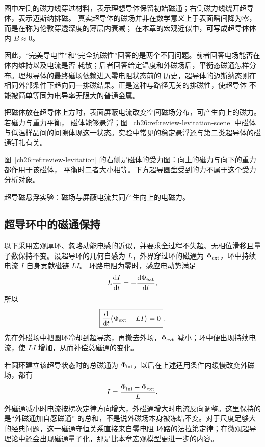 {图中左侧的磁力线穿过材料，表示理想导体保留初始磁通；右侧磁力线绕开超导体，表示迈斯纳排磁。
真实超导体的磁场并非在数学意义上于表面瞬间降为零，而是在称为伦敦穿透深度的薄层内衰减；
在本章的宏观近似中，可写成超导体体内 $B\approx0$。

因此，“完美导电性”和“完全抗磁性”回答的是两个不同问题。前者回答电场能否在体内维持以及电流是否
耗散；后者回答给定温度和外磁场后，平衡态磁通怎样分布。理想导体的最终磁场依赖进入零电阻状态前的
历史，超导体的迈斯纳态则在相同外部条件下趋向同一排磁结果。正是这种与路径无关的排磁性，使超导体
不能被简单等同为电导率无限大的普通金属。

把磁体放在超导体上方时，表面屏蔽电流改变空间磁场分布，可产生向上的磁力。若磁力与重力平衡，
磁体能够悬浮；图~\ref{ch26:ref:review-levitation-scene} 中磁体与低温样品间的间隙体现这一状态。实验中常见的稳定悬浮还与第二类超导体的磁通钉扎有关。

图~\ref{ch26:ref:review-levitation} 的右侧是磁体的受力图：向上的磁力与向下的重力都作用于该磁体，
平衡时二者大小相等。下方超导圆盘受到的力不属于这个受力分析对象。

\levitationDiagram

%
{超导磁悬浮实验：磁场与屏蔽电流共同产生向上的电磁力。\label{ch26:ref:review-levitation-scene}}


\subsection{超导环中的磁通保持}


以下采用宏观厚环、忽略动能电感的近似，并要求全过程不失超、无相位滑移且量子数保持不变。设超导环的几何自感为 $L$，外界穿过环的磁通为 $\Phi_{\rm ext}$，环中持续电流 $I$ 自身贡献磁链 $LI$。
环路电阻为零时，感应电动势满足
\begin{equation}
  L\frac{\mathop{}\!\mathrm d I}{\mathop{}\!\mathrm d t}=-\frac{\mathop{}\!\mathrm d\Phi_{\rm ext}}{\mathop{}\!\mathrm d t},
\end{equation}
所以
\begin{equation}
  \boxed{\frac{\mathop{}\!\mathrm d}{\mathop{}\!\mathrm d t}\bigl(\Phi_{\rm ext}+LI\bigr)=0}.
\end{equation}
先在外磁场中把圆环冷却到超导态，再撤去外场，$\Phi_{\rm ext}$ 减小；环中便出现持续电流，使 $LI$
增加，从而补偿总磁通的变化。

若圆环建立该超导状态时的总磁通为 $\Phi_{\rm ini}$，以后在上述适用条件内缓慢改变外磁场，都有
\begin{equation}
  I=\frac{\Phi_{\rm ini}-\Phi_{\rm ext}}{L}.
\end{equation}
外磁通减小时电流按楞次定律方向增大，外磁通增大时电流反向调整。这里保持的是“外磁通加自感磁通”
的总和，不是说外磁场本身被冻结不变。对于尺度足够大的经典问题，这一磁通守恒关系直接来自零电阻
环路的法拉第定律；在微观超导理论中还会出现磁通量子化，那是比本章宏观模型更进一步的内容。

}
